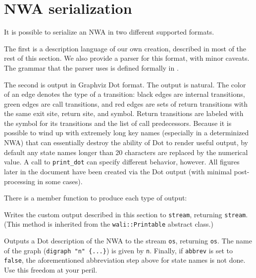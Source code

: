 \section{NWA serialization}
\label{Se:serialization}

\newenvironment{grammar}{\begin{equation*}\begin{array}{lrl}}{\end{array}\end{equation*}}
\newcommand{\nonterm}[1]{\ensuremath{\langle}\textit{#1}\ensuremath{\rangle}}
\newcommand{\term}[1]{\textrm`\texttt{#1}\textrm'}
\newcommand{\cfgsp}{\ \ }


It is possible to serialize an NWA in two different supported
formats.

The first is a description language of our own creation, described in
most of the rest of this section. We also provide a parser for this format,
with minor caveats. The grammar that the parser uses is defined
formally in .

The second is output in Graphviz Dot format. The output is natural. The color
of an edge denotes the type of a transition: black edges are internal
transitions, green edges are call transitions, and red edges are sets of return
transitions with the same exit site, return site, and symbol. Return
transitions are labeled with the symbol for its
transitions and the list of call predecessors.  Because it is possible to wind up with
extremely long key names (especially in a determinized NWA) that can
essentially destroy the ability of Dot to render useful output, by default
any state names longer than 20 characters are replaced by the numerical
value. A call to \texttt{print\_dot} can specify different behavior, however.
All figures later in the document have been created via the Dot output (with
minimal post-processing in some cases).

There is a member function to produce each type of output:
\begin{functionlist}
    Writes the custom output described in this section
    to \texttt{stream}, returning \texttt{stream}.
    (This method is inherited from
    the \texttt{wali::Printable} abstract class.)

  \functionitemnonl[\texttt{std::ostream\& NWA::print\_dot(
      \parbox[t][2\baselineskip][t]{4in}{
                 ostream \& os, std::string const \& n,\\
                 bool abbrev = true)}}]
    Outputs a Dot description of the NWA to the stream \texttt{os}, returning
    \texttt{os}.  The name of the graph (\texttt{digraph "n" \{...\}}) is
    given by \texttt{n}. Finally, if \texttt{abbrev} is set to
    \texttt{false}, the aforementioned abbreviation step above for state
    names is not done. Use this freedom at your peril.
\end{functionlist}

